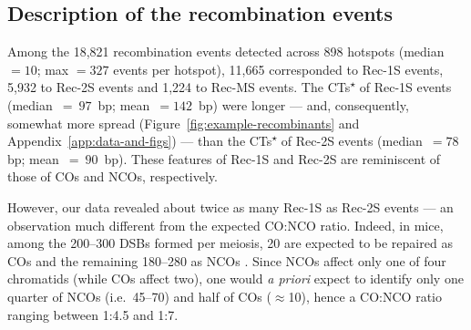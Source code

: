 \subsection{Description of the recombination events} 

Among the 18,821 recombination events detected across 898 hotspots (median~$= 10$; max $= 327$ events per hotspot), 11,665 corresponded to Rec-1S events, 5,932 to Rec-2S events and 1,224 to Rec-MS events.
The CTs\textsuperscript{$\star$} of Rec-1S events (median~$=~97$~bp; mean~$= 142$~bp) were longer — and, consequently, somewhat more spread (Figure~\ref{fig:example-recombinants} and Appendix~\ref{app:data-and-figs}) — than the CTs\textsuperscript{$\star$} of Rec-2S events (median~$= 78$ bp; mean~$=~90$~bp).
These features of Rec-1S and Rec-2S are reminiscent of those of COs and NCOs, respectively.

%

However, our data revealed about twice as many Rec-1S as Rec-2S events — an observation much different from the expected CO:NCO ratio.
Indeed, in mice, among the 200--300 DSBs formed per meiosis, 20 are expected to be repaired as COs and the remaining 180--280 as NCOs \citep{baudat2007regulating, martinez-perez2009distribution}. 
Since NCOs affect only one of four chromatids (while COs affect two), one would \textit{a priori} expect to identify only one quarter of NCOs (i.e.\ 45--70) and half of COs ($\approx$10), hence a CO:NCO ratio ranging between 1:4.5 and 1:7. 

